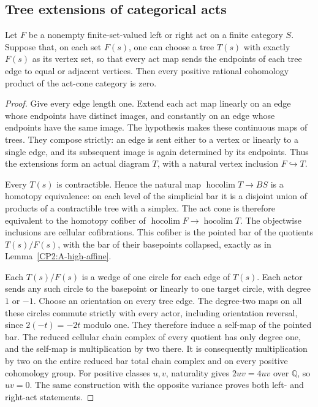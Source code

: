 \subsection{Tree extensions of categorical acts}

\begin{lemma}
\label{A7:tree-act}
Let $F$ be a nonempty finite-set-valued left or right act on a
finite category $S$.  Suppose that, on each set $F(s)$, one can
choose a tree $T(s)$ with exactly $F(s)$ as its vertex set, so
that every act map sends the endpoints of each tree edge to
equal or adjacent vertices.  Then every positive rational
cohomology product of the act-cone category is zero.
\end{lemma}
\begin{proof}
Give every edge length one. Extend each act map linearly on an
edge whose endpoints have distinct images, and constantly on
an edge whose endpoints have the same image. The hypothesis
makes these continuous maps of trees. They compose strictly:
an edge is sent either to a vertex or linearly to a single
edge, and its subsequent image is again determined by its
endpoints. Thus the extensions form an actual diagram $T$,
with a natural vertex inclusion $F\hookrightarrow T$.

Every $T(s)$ is contractible. Hence the natural map
$\operatorname{hocolim}T\to BS$ is a homotopy equivalence:
on each level of the simplicial bar it is a disjoint union of
products of a contractible tree with a simplex. The act cone
is therefore equivalent to the homotopy cofiber of
$\operatorname{hocolim}F\to\operatorname{hocolim}T$.
The objectwise inclusions are cellular cofibrations. This
cofiber is the pointed bar of the quotients $T(s)/F(s)$, with
the bar of their basepoints collapsed, exactly as in
Lemma~\ref{CP2:A-high-affine}.

Each $T(s)/F(s)$ is a wedge of one circle for each edge of
$T(s)$. Each actor sends any such circle to the basepoint or
linearly to one target circle, with degree $1$ or $-1$.
Choose an orientation on every tree edge. The degree-two maps
on all these circles commute strictly with every actor,
including orientation reversal, since $2(-t)=-2t$ modulo one.
They therefore induce a self-map of the pointed bar.
The reduced cellular chain complex of every quotient has
only degree one, and the self-map is multiplication by two
there. It is consequently multiplication by two on the
entire reduced bar total chain complex and on every positive
cohomology group. For positive classes $u,v$, naturality
gives $2uv=4uv$ over $\mathbb Q$, so $uv=0$.
The same construction with the opposite variance proves
both left- and right-act statements.
\end{proof}


